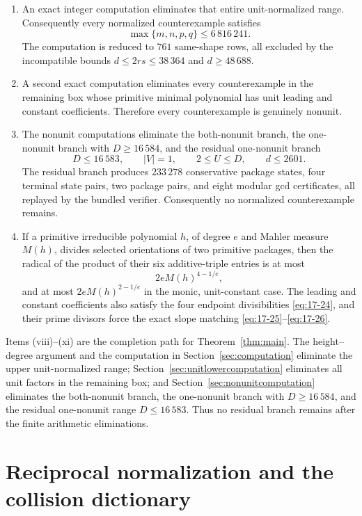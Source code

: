 \documentclass[11pt]{article}
\numberwithin{equation}{section}
\theoremstyle{definition}
\begin{document}
\begin{enumerate}[label=(\roman*)]
\item An exact integer computation eliminates that entire unit-normalized
range.  Consequently every normalized counterexample satisfies
\[
 \boxed{\max\{m,n,p,q\}\leq6\,816\,241.}
\]
The computation is reduced to \(761\) same-shape rows, all excluded by the
incompatible bounds \(d\leq2rs\leq38\,364\) and \(d\geq48\,688\).

\item A second exact computation eliminates every counterexample in the
remaining box whose primitive minimal polynomial has unit leading and
constant coefficients.  Therefore every counterexample is genuinely
nonunit.

\item The nonunit computations eliminate the both-nonunit branch, the
one-nonunit branch with \(D\geq16\,584\), and the residual
one-nonunit branch
\[
 D\leq16\,583,\qquad |V|=1,\qquad 2\leq U\leq D,\qquad d\leq2601.
\]
The residual branch produces \(233\,278\) conservative package states, four
terminal state pairs, two package pairs, and eight modular gcd certificates,
all replayed by the bundled verifier.  Consequently no normalized
counterexample remains.

\item If a primitive irreducible polynomial \(h\), of degree \(e\) and
Mahler measure \(M(h)\), divides selected orientations of two primitive
packages, then the radical of the product of their six additive-triple
entries is at most
\[
 2eM(h)^{4-1/e},
\]
and at most \(2eM(h)^{2-1/e}\) in the monic, unit-constant case.  The
leading and constant coefficients also satisfy the four endpoint
divisibilities \eqref{eq:17-24}, and their prime divisors force the exact slope
matching \eqref{eq:17-25}--\eqref{eq:17-26}.
\end{enumerate}

Items (viii)--(xi) are the completion path for Theorem~\ref{thm:main}.  The
height--degree argument and the computation in Section~\ref{sec:computation}
eliminate the upper unit-normalized range; Section~\ref{sec:unitlowercomputation}
eliminates all unit factors in the remaining box; and
Section~\ref{sec:nonunitcomputation} eliminates the both-nonunit branch, the
one-nonunit branch with \(D\geq16\,584\), and the residual
one-nonunit range \(D\leq16\,583\).  Thus no residual branch remains after the
finite arithmetic eliminations.

\section{Reciprocal normalization and the collision dictionary}
\label{sec:dictionary}
\end{document}
